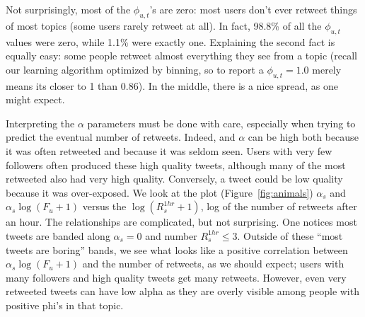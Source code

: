 Not surprisingly, most of the $\phi_{u,t}$'s are zero: most users don't ever retweet things of most topics (some users rarely retweet at all).
In fact, 98.8\% of all the $\phi_{u,t}$ values were zero, while 1.1\% were exactly one.
Explaining the second fact is equally easy: some people retweet almost everything they see from a topic (recall our learning algorithm optimized by binning, so to report a $\phi_{u,t}=1.0$ merely means its closer to 1 than 0.86).  
In the middle, there is a nice spread, as one might expect.  

Interpreting the $\alpha$ parameters must be done with care, especially when trying to predict the eventual number of retweets.
Indeed, and $\alpha$ can be high both because it was often retweeted and because it was seldom seen.
Users with very few followers often produced these high quality tweets, although many of the most retweeted also had very high quality.
Conversely, a tweet could be low quality because it was over-exposed.  We look at the plot (Figure~\ref{fig:animals}) $\alpha_s$ and $\alpha_s\log(F_u+1)$ versus the $\log(R_s^{1hr}+1)$, log of the number of retweets after an hour.  
The relationships are complicated, but not surprising.  
One notices most tweets are banded along $\alpha_s=0$ and number $R_s^{1hr}\le 3$.  
Outside of these ``most tweets are boring'' bands, we see what looks like a positive correlation between $\alpha_s\log(F_u+1)$ and the number of retweets, as we should expect; users with many followers and high quality tweets get many retweets.  However, even very retweeted tweets can have low alpha as they are overly visible among people with positive phi's in that topic.  

